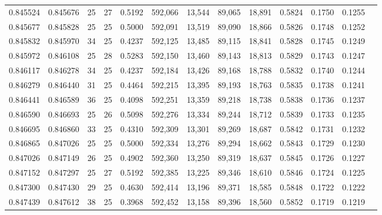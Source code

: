 \begin{tabular}{rrrrrrrrrrrrr}
0.845524 & 0.845676 &    25 &  27 &                                     0.5192 & 592,066 &  13,544 &  89,065 &  18,891 & 0.5824 & 0.1750 & 0.1255 \\
0.845677 & 0.845828 &    25 &  25 &                                     0.5000 & 592,091 &  13,519 &  89,090 &  18,866 & 0.5826 & 0.1748 & 0.1252 \\
0.845832 & 0.845970 &    34 &  25 &                                     0.4237 & 592,125 &  13,485 &  89,115 &  18,841 & 0.5828 & 0.1745 & 0.1249 \\
0.845972 & 0.846108 &    25 &  28 &                                     0.5283 & 592,150 &  13,460 &  89,143 &  18,813 & 0.5829 & 0.1743 & 0.1247 \\
0.846117 & 0.846278 &    34 &  25 &                                     0.4237 & 592,184 &  13,426 &  89,168 &  18,788 & 0.5832 & 0.1740 & 0.1244 \\
0.846279 & 0.846440 &    31 &  25 &                                     0.4464 & 592,215 &  13,395 &  89,193 &  18,763 & 0.5835 & 0.1738 & 0.1241 \\
0.846441 & 0.846589 &    36 &  25 &                                     0.4098 & 592,251 &  13,359 &  89,218 &  18,738 & 0.5838 & 0.1736 & 0.1237 \\
0.846590 & 0.846693 &    25 &  26 &                                     0.5098 & 592,276 &  13,334 &  89,244 &  18,712 & 0.5839 & 0.1733 & 0.1235 \\
0.846695 & 0.846860 &    33 &  25 &                                     0.4310 & 592,309 &  13,301 &  89,269 &  18,687 & 0.5842 & 0.1731 & 0.1232 \\
0.846865 & 0.847026 &    25 &  25 &                                     0.5000 & 592,334 &  13,276 &  89,294 &  18,662 & 0.5843 & 0.1729 & 0.1230 \\
0.847026 & 0.847149 &    26 &  25 &                                     0.4902 & 592,360 &  13,250 &  89,319 &  18,637 & 0.5845 & 0.1726 & 0.1227 \\
0.847152 & 0.847297 &    25 &  27 &                                     0.5192 & 592,385 &  13,225 &  89,346 &  18,610 & 0.5846 & 0.1724 & 0.1225 \\
0.847300 & 0.847430 &    29 &  25 &                                     0.4630 & 592,414 &  13,196 &  89,371 &  18,585 & 0.5848 & 0.1722 & 0.1222 \\
0.847439 & 0.847612 &    38 &  25 &                                     0.3968 & 592,452 &  13,158 &  89,396 &  18,560 & 0.5852 & 0.1719 & 0.1219 \\

\end{tabular}
